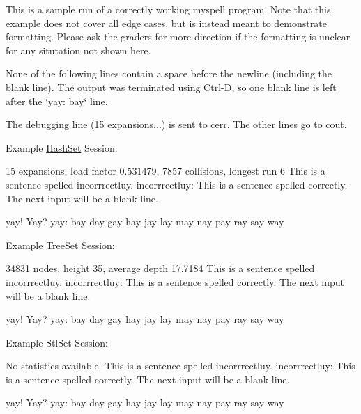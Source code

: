 This is a sample run of a correctly working myspell program. Note that this example does not cover all edge cases, but is instead meant to demonstrate formatting. Please ask the graders for more direction if the formatting is unclear for any situtation not shown here.

None of the following lines contain a space before the newline (including the blank line). The output was terminated using Ctrl-\/\-D, so one blank line is left after the \char`\"{}yay\-: bay\char`\"{} line.

The debugging line (15 expansions...) is sent to cerr. The other lines go to cout. 



Example \hyperlink{class_hash_set}{Hash\-Set} Session\-: \begin{DoxyVerb}     %
     15 expansions, load factor 0.531479, 7857 collisions, longest run 6
     This is a sentence spelled incorrrectluy.
     incorrrectluy:
     This is a sentence spelled correctly.
     The next input will be a blank line.

     yay! Yay?
     yay: bay day gay hay jay lay may nay pay ray say way
\end{DoxyVerb}


Example \hyperlink{class_tree_set}{Tree\-Set} Session\-: \begin{DoxyVerb}     %
     34831 nodes, height 35, average depth 17.7184
     This is a sentence spelled incorrrectluy.
     incorrrectluy:
     This is a sentence spelled correctly.
     The next input will be a blank line.

     yay! Yay?
     yay: bay day gay hay jay lay may nay pay ray say way
\end{DoxyVerb}


Example Stl\-Set Session\-: \begin{DoxyVerb}     %
     No statistics available.
     This is a sentence spelled incorrrectluy.
     incorrrectluy:
     This is a sentence spelled correctly.
     The next input will be a blank line.

     yay! Yay?
     yay: bay day gay hay jay lay may nay pay ray say way\end{DoxyVerb}
 